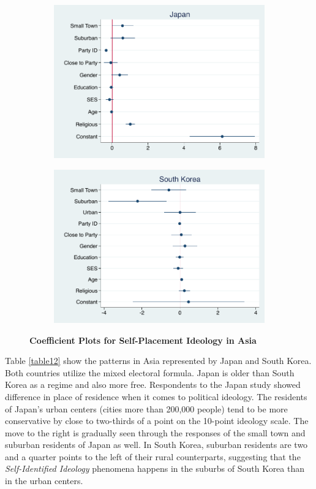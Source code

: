 \documentclass[12pt, titlepage]{article}
\newcommand\e{\emph}
\newcommand\tb{\textbf}
\begin{document}
\begin{figure}[H]
	\centering
	\begin{subfigure}[b]{0.475\textwidth}
		\centering
		\includegraphics[width=\textwidth]{IdeologyCoef/Japan}
	\end{subfigure}
	\hfill
	\begin{subfigure}[b]{0.475\textwidth}  
		\centering 
		\includegraphics[width=\textwidth]{IdeologyCoef/SouthKorea}
	\end{subfigure}
	\caption[ \tb{Self-Placement Ideology - Asia} ]
	{\tb {Coefficient Plots for Self-Placement Ideology in Asia} }
	\label{Asia}
\end{figure}

Table \ref{table12} show the patterns in Asia represented by Japan and South Korea. Both countries utilize the mixed electoral formula. Japan is older than South Korea as a regime and also more free. Respondents to the Japan study showed difference in place of residence when it comes to political ideology. The residents of Japan's urban centers (cities more than 200,000 people) tend to be more conservative by close to two-thirds of a point on the 10-point ideology scale. The move to the right is gradually seen through the responses of the small town and suburban residents of Japan as well. In South Korea, suburban residents are two and a quarter points to the left of their rural counterparts, suggesting that the \e{Self-Identified Ideology} phenomena happens in the suburbs of South Korea than in the urban centers. 
\end{document}
